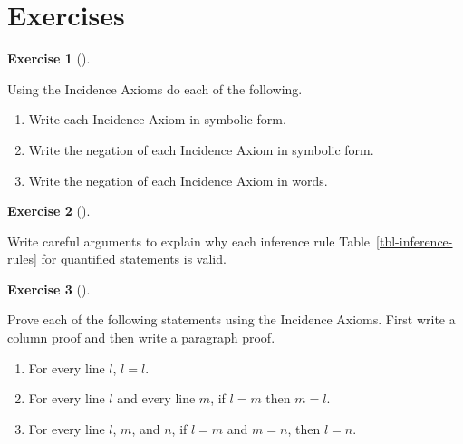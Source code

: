 \documentclass[
  letterpaper,
  10pt,
  reqno,
  twopage,
  openany]{book}
\providecommand{\tightlist}{%
  \setlength{\itemsep}{0pt}\setlength{\parskip}{0pt}}\usepackage{longtable,booktabs,array}
\theoremstyle{plain}
\theoremstyle{definition}
\newtheorem{exercise}{Exercise}[chapter]
\theoremstyle{definition}
\theoremstyle{definition}
\theoremstyle{plain}
\theoremstyle{plain}
\theoremstyle{remark}
\begin{document}
\hypertarget{exercises-2}{%
\section{Exercises}\label{exercises-2}}

\leavevmode{}%
\begin{exercise}[]\label{exr-incidaxioms}

Using the Incidence Axioms do each of the following.

\begin{enumerate}
\def\labelenumi{\arabic{enumi}.}
\tightlist
\item
  Write each Incidence Axiom in symbolic form.
\item
  Write the negation of each Incidence Axiom in symbolic form.
\item
  Write the negation of each Incidence Axiom in words.
\end{enumerate}

\end{exercise}

\leavevmode{}%
\begin{exercise}[]\label{exr-quantified-statements}

Write careful arguments to explain why each inference rule
Table~\ref{tbl-inference-rules} for quantified statements is valid.

\end{exercise}

\leavevmode{}%
\begin{exercise}[]\label{exr-geoproofst}

Prove each of the following statements using the Incidence Axioms. First
write a column proof and then write a paragraph proof.

\begin{enumerate}
\def\labelenumi{\arabic{enumi}.}
\tightlist
\item
  For every line \(l\), \(l=l\).
\item
  For every line \(l\) and every line \(m\), if \(l=m\) then \(m=l\).
\item
  For every line \(l\), \(m\), and \(n\), if \(l=m\) and \(m=n\), then
  \(l=n\).
\end{enumerate}

\end{exercise}
\end{document}
